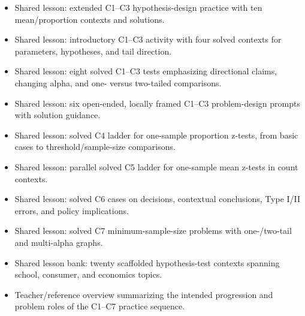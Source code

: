 \begin{itemize}
  \item {}

  Shared lesson: extended C1–C3 hypothesis-design practice with ten mean/proportion contexts and solutions.

  \item {}

  Shared lesson: introductory C1–C3 activity with four solved contexts for parameters, hypotheses, and tail direction.

  \item {}

  Shared lesson: eight solved C1–C3 tests emphasizing directional claims, changing alpha, and one- versus two-tailed comparisons.

  \item {}

  Shared lesson: six open-ended, locally framed C1–C3 problem-design prompts with solution guidance.

  \item {}

  Shared lesson: solved C4 ladder for one-sample proportion z-tests, from basic cases to threshold/sample-size comparisons.

  \item {}

  Shared lesson: parallel solved C5 ladder for one-sample mean z-tests in count contexts.

  \item {}

  Shared lesson: solved C6 cases on decisions, contextual conclusions, Type I/II errors, and policy implications.

  \item {}

  Shared lesson: solved C7 minimum-sample-size problems with one-/two-tail and multi-alpha graphs.

  \item {}

  Shared lesson bank: twenty scaffolded hypothesis-test contexts spanning school, consumer, and economics topics.

  \item {}

  Teacher/reference overview summarizing the intended progression and problem roles of the C1–C7 practice sequence.
\end{itemize}

